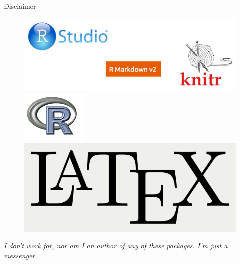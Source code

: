 \documentclass[10pt]{beamer}\usepackage[]{graphicx}\usepackage[]{color}
\begin{document}
\begin{frame}{Disclaimer}
\begin{figure}
\includegraphics[width=1.0\columnwidth]{rstudio.png}\\[5mm]
\includegraphics[width=0.2\columnwidth]{rlogo.png}\\[5mm]
\includegraphics[width=0.2\columnwidth]{LaTeX_logo.png}
\end{figure}

\textit{I don't work for, nor am I an author of any of these packages. I'm just a messenger.}

\end{frame}
\end{document}
